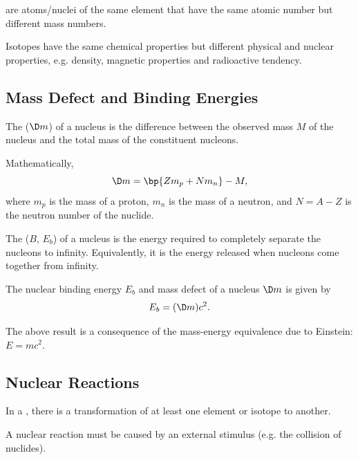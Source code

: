 \begin{definition}
     are atoms/nuclei of the same element that have the same atomic number but different mass numbers.
\end{definition}

Isotopes have the same chemical properties but different physical and nuclear properties, e.g. density, magnetic properties and radioactive tendency.

\subsection{Mass Defect and Binding Energies}

\begin{definition}
    The  ($\D m$) of a nucleus is the difference between the observed mass $M$ of the nucleus and the total mass of the constituent nucleons.
\end{definition}

Mathematically, \[\D m = \bp{Z m_p + N m_n} - M,\] where $m_p$ is the mass of a proton, $m_n$ is the mass of a neutron, and $N = A - Z$ is the neutron number of the nuclide.

\begin{definition}
    The  ($B$, $E_b$) of a nucleus is the energy required to completely separate the nucleons to infinity. Equivalently, it is the energy released when nucleons come together from infinity.
\end{definition}

\begin{proposition}
    The nuclear binding energy $E_b$ and mass defect of a nucleus $\D m$ is given by \[E_b = (\D m) c^2.\]
\end{proposition}

The above result is a consequence of the mass-energy equivalence due to Einstein: $E = mc^2$.

\subsection{Nuclear Reactions}

\begin{definition}
    In a , there is a transformation of at least one element or isotope to another.
\end{definition}

A nuclear reaction must be caused by an external stimulus (e.g. the collision of nuclides).

